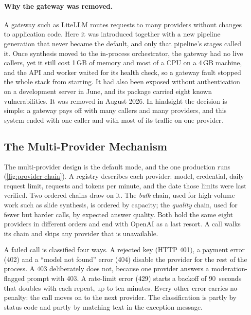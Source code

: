 \paragraph{Why the gateway was removed.}
A gateway such as LiteLLM routes requests to many providers without changes to
application code. Here it was introduced together with a new pipeline generation
that never became the default, and only that pipeline's stages called it. Once
synthesis moved to the in-process orchestrator, the gateway had no live callers,
yet it still cost 1\,GB of memory and most of a CPU on a 4\,GB machine, and the
API and worker waited for its health check, so a gateway fault stopped the whole
stack from starting. It had also been exposed without authentication on a
development server in June, and its package carried eight known
vulnerabilities. It was removed in August 2026. In hindsight the decision is
simple: a gateway pays off with many callers and many providers, and this system
ended with one caller and with most of its traffic on one provider.

\subsection{The Multi-Provider Mechanism}
\label{sec:multi-provider}

The multi-provider design is the default mode, and the one production runs
(\cref{fig:provider-chain}). A registry describes each provider: model,
credential, daily request limit, requests and tokens per minute, and the date
those limits were last verified. Two ordered chains draw on it. The \emph{bulk}
chain, used for high-volume work such as slide synthesis, is ordered by capacity;
the \emph{quality} chain, used for fewer but harder calls, by expected answer
quality. Both hold the same eight providers in different orders and end with
OpenAI as a last resort. A call walks its chain and skips any provider that is
unavailable.

A failed call is classified four ways. A rejected key (HTTP 401), a payment
error (402) and a ``model not found'' error (404) disable the provider for the
rest of the process. A 403 deliberately does not, because one provider answers a
moderation-flagged prompt with 403. A rate-limit error (429) starts a backoff of 90~seconds that doubles
with each repeat, up to ten minutes. Every other error carries no penalty: the
call moves on to the next provider. The classification is partly by status code
and partly by matching text in the exception message.

